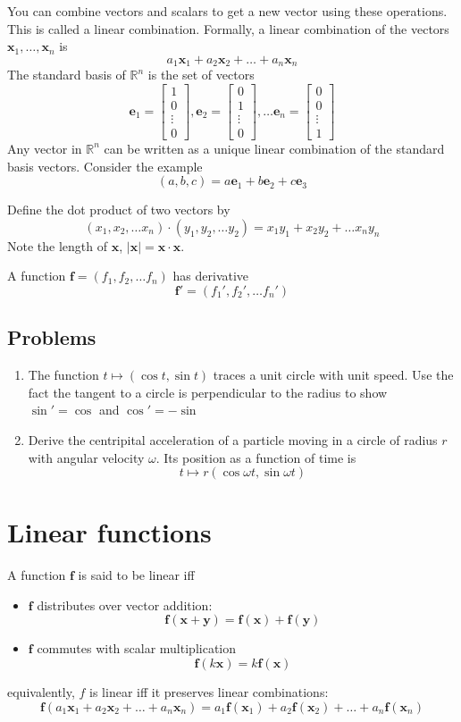 \documentclass{scrartcl}
\providecommand{\R}{\mathbb{R}}
\renewcommand{\vec}{\mathbold}
\newcommand{\f}{\vec f}
\begin{document}
You can combine vectors and scalars to get a new vector using these operations.
This is called a linear combination. Formally, a linear combination of the
vectors $\vec x_1,\dots, \vec x_n$ is
\[
  a_1\vec x_1+a_2\vec x_2+\dots + a_n\vec x_n
\]
\newcommand{\basis}{\vec e}
The standard basis of $\R^n$ is the set of vectors
\[
  \basis_1=
  \begin{bmatrix}
    1 \\ 0 \\ \vdots \\ 0
  \end{bmatrix},
  \basis_2=
  \begin{bmatrix}
    0 \\ 1 \\ \vdots \\ 0
  \end{bmatrix},\dots
  \basis_n=
  \begin{bmatrix}
    0 \\ 0 \\ \vdots \\ 1
  \end{bmatrix}
\]
Any vector in $\R^n$ can be written as a unique linear combination of the
standard basis vectors. Consider the example
\[
  (a,b,c)=a\basis_1+b\basis_2+c\basis_3
\]

Define the dot product of two vectors by
\[
  (x_1,x_2,\dots x_n)\cdot (y_1,y_2,\dots y_2)=x_1y_1+x_2y_2+\dots x_ny_n
\]
Note the length of $\vec x$, $|\vec x|=\vec x \cdot \vec x$.

A function $\f=(f_1,f_2,\dots f_n)$ has derivative
\[
  \f'=(f_1',f_2',\dots f_n')
\]
\subsection*{Problems}
\begin{enumerate}
\item The function $t\mapsto (\cos t, \sin t)$ traces a unit circle with unit
  speed. Use the fact the tangent to a circle is perpendicular to the radius to
  show $\sin'=\cos$ and $\cos'=-\sin$
\item Derive the centripital acceleration of a particle moving in a circle of
  radius $r$ with angular velocity $\omega$. Its position as a function of time is
  \[
    t\mapsto r(\cos \omega t, \sin \omega t)
  \]
\end{enumerate}
\section{Linear functions}
A function $\f$ is said to be linear iff
\begin{itemize}
\item $\f$ distributes over vector addition:
  \[
    \f(\vec x+ \vec y)=\f(\vec x)+\f(\vec y)
  \]
\item $\f$ commutes with scalar multiplication
  \[
    \f(k\vec x)=k\f(\vec x)
  \]
\end{itemize}
equivalently, $f$ is linear iff it preserves linear
combinations:
\[
  \f(a_1\vec x_1 + a_2 \vec x_2 + \dots + a_n \vec x_n) = a_1\f(\vec x_1) + a_2 \f(\vec x_2) + \dots + a_n \f(\vec x_n)
\]
\end{document}
